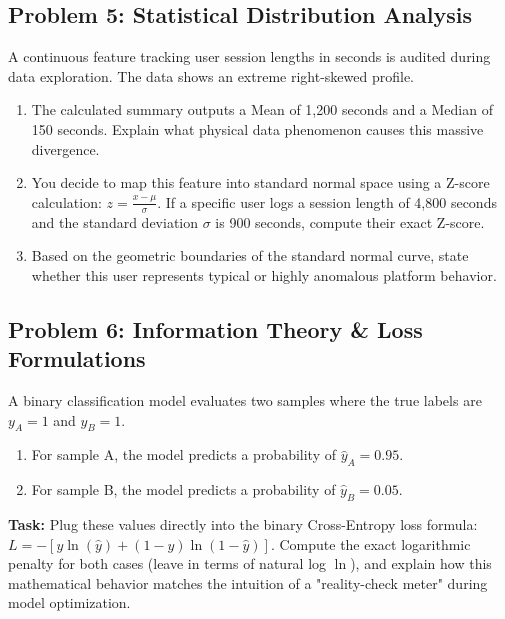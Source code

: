 \documentclass[12pt,a4paper]{article}
\begin{document}
\subsection*{Problem 5: Statistical Distribution Analysis}
A continuous feature tracking user session lengths in seconds is audited during data exploration. The data shows an extreme right-skewed profile.
\begin{enumerate}
    \item The calculated summary outputs a Mean of 1,200 seconds and a Median of 150 seconds. Explain what physical data phenomenon causes this massive divergence.
    \item You decide to map this feature into standard normal space using a Z-score calculation: $z = \frac{x - \mu}{\sigma}$. If a specific user logs a session length of 4,800 seconds and the standard deviation $\sigma$ is 900 seconds, compute their exact Z-score.
    \item Based on the geometric boundaries of the standard normal curve, state whether this user represents typical or highly anomalous platform behavior.
\end{enumerate}

\subsection*{Problem 6: Information Theory \& Loss Formulations}
A binary classification model evaluates two samples where the true labels are $y_A = 1$ and $y_B = 1$.
\begin{enumerate}
    \item For sample A, the model predicts a probability of $\hat{y}_A = 0.95$.
    \item For sample B, the model predicts a probability of $\hat{y}_B = 0.05$.
\end{enumerate}
\textbf{Task:} Plug these values directly into the binary Cross-Entropy loss formula: $L = - [y \ln(\hat{y}) + (1-y)\ln(1-\hat{y})]$. Compute the exact logarithmic penalty for both cases (leave in terms of natural log $\ln$), and explain how this mathematical behavior matches the intuition of a "reality-check meter" during model optimization.
\end{document}
